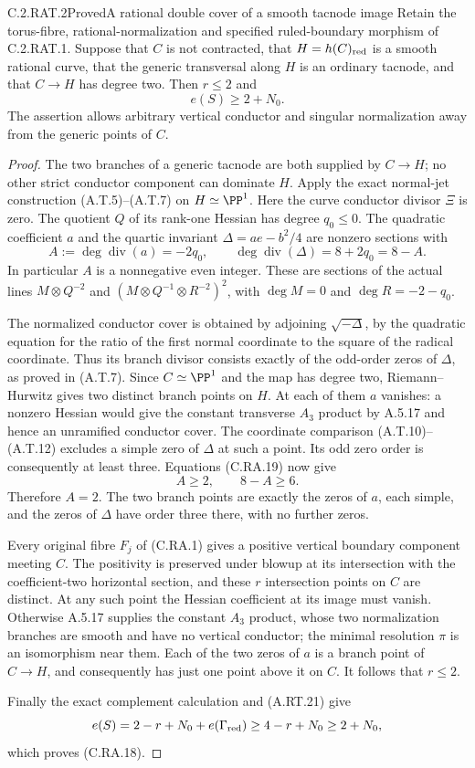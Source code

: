 \begin{statement}{C.2.RAT.2}{Proved}{A rational double cover of a smooth tacnode image}
Retain the torus-fibre, rational-normalization and specified
ruled-boundary morphism of C.2.RAT.1. Suppose that $C$ is not
contracted, that $H=h(C)_{\rm red}$ is a smooth rational curve,
that the generic transversal along $H$ is an ordinary tacnode,
and that $C\to H$ has degree two. Then $r\le2$ and
\[
                         e(S)\ge2+N_0.
\tag{C.RA.18}
\]
The assertion allows arbitrary vertical conductor and singular
normalization away from the generic points of $C$.
\end{statement}
\begin{proof}
The two branches of a generic tacnode are both supplied by
$C\to H$; no other strict conductor component can dominate $H$.
Apply the exact normal-jet construction (A.T.5)--(A.T.7) on
$H\simeq\PP^1$. Here the curve conductor divisor $\Xi$ is zero.
The quotient $Q$ of its rank-one Hessian has degree $q_0\le0$.
The quadratic coefficient $a$ and the quartic invariant
$\Delta=ae-b^2/4$ are nonzero sections with
\[
 A:=\deg\operatorname{div}(a)=-2q_0,\qquad
 \deg\operatorname{div}(\Delta)=8+2q_0=8-A.
\tag{C.RA.19}
\]
In particular $A$ is a nonnegative even integer. These are
sections of the actual lines $M\otimes Q^{-2}$ and
$(M\otimes Q^{-1}\otimes R^{-2})^2$, with
$\deg M=0$ and $\deg R=-2-q_0$.

The normalized conductor cover is obtained by adjoining
$\sqrt{-\Delta}$, by the quadratic equation for the ratio of
the first normal coordinate to the square of the radical
coordinate. Thus its branch divisor consists exactly of the
odd-order zeros of $\Delta$, as proved in (A.T.7). Since
$C\simeq\PP^1$ and the map has degree two, Riemann--Hurwitz
gives two distinct branch points on $H$. At each of them
$a$ vanishes: a nonzero Hessian would give the constant
transverse $A_3$ product by A.5.17 and hence an unramified
conductor cover. The coordinate comparison
(A.T.10)--(A.T.12) excludes a simple zero of $\Delta$ at
such a point. Its odd zero order is consequently at least
three. Equations (C.RA.19) now give
\[
                        A\ge2,\qquad 8-A\ge6.
\tag{C.RA.20}
\]
Therefore $A=2$. The two branch points are exactly the
zeros of $a$, each simple, and the zeros of $\Delta$ have
order three there, with no further zeros.

Every original fibre $F_j$ of (C.RA.1) gives a positive
vertical boundary component meeting $C$. The positivity
is preserved under blowup at its intersection with the
coefficient-two horizontal section, and these $r$
intersection points on $C$ are distinct. At any such point
the Hessian coefficient at its image must vanish. Otherwise
A.5.17 supplies the constant $A_3$ product, whose two
normalization branches are smooth and have no vertical
conductor; the minimal resolution $\pi$ is an isomorphism
near them. Each of the two zeros of $a$ is a branch point
of $C\to H$, and consequently has just one point above it
on $C$. It follows that $r\le2$.

Finally the exact complement calculation and (A.RT.21) give
\[
 e(S)=2-r+N_0+e(\Gamma_{\rm red})
                  \ge4-r+N_0\ge2+N_0,
\]
which proves (C.RA.18).
\end{proof}



